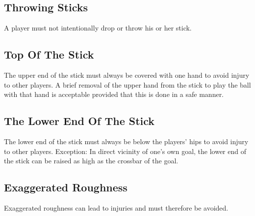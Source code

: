 \subsection{Throwing Sticks}
A player must not intentionally drop or throw his or her stick.

\subsection{Top Of The Stick}
The upper end of the stick must always be covered with one hand to avoid injury to other players.
A brief removal of the upper hand from the stick to play the ball with that hand is acceptable provided that this is done in a safe manner.

\subsection{The Lower End Of The Stick}
The lower end of the stick must always be below the players' hips to avoid injury to other players.
Exception: In direct vicinity of one's own goal, the lower end of the stick can be raised as high as the crossbar of the goal.

\subsection{Exaggerated Roughness}
Exaggerated roughness can lead to injuries and must therefore be avoided.


